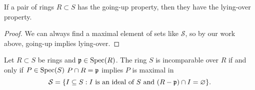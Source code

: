 \documentclass{ximera}
\begin{document}
\begin{corollary}
  If a pair of rings $R\subset S$ has the going-up property, then they
  have the lying-over property.
  \begin{proof}
    We can always find a maximal element of sets like $\mathcal{S}$,
    so by our work above, going-up implies lying-over.
  \end{proof}
\end{corollary}


\begin{proposition}
  Let $R\subset S$ be rings and $\mathfrak{p}\in\operatorname{Spec}(R)$. The ring $S$ is
  incomparable over $R$ if and only if $P\in\operatorname{Spec}(S)$ $P\cap R =\mathfrak{p}$
  implies $P$ is maximal in
  \[
  \mathcal{S} = \{I\subseteq S: \text{$I$ is an ideal of $S$ and
    $(R-\mathfrak{p})\cap I = \varnothing$}\}.
  \]
\end{proposition}
\end{document}
